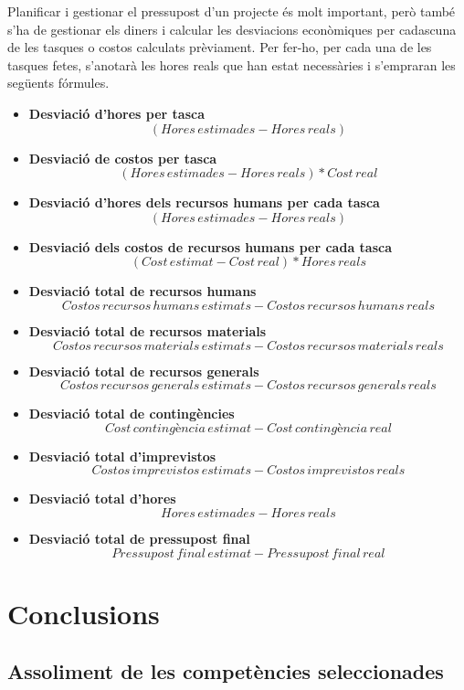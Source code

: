 \documentclass[a4paper]{article}
\begin{document}
Planificar i gestionar el pressupost d'un projecte és molt important, però també s'ha de gestionar els diners i calcular les desviacions econòmiques per cadascuna de les tasques o costos calculats prèviament. Per fer-ho, per cada una de les tasques fetes, s'anotarà les hores reals que han estat necessàries i s'empraran les següents fórmules.
\begin{itemize}
    \item \textbf{Desviació d'hores per tasca}
    \[(Hores\,estimades - Hores\,reals)\]
    \item \textbf{Desviació de costos per tasca}
    \[(Hores\,estimades - Hores\,reals) * Cost\,real\]
    \item \textbf{Desviació d'hores dels recursos humans per cada tasca}
    \[(Hores\,estimades - Hores\,reals)\]
    \item \textbf{Desviació dels costos de recursos humans per cada tasca}
    \[(Cost\, estimat - Cost\,real) * Hores\,reals\]
    \item \textbf{Desviació total de recursos humans}
    \[Costos\,recursos\,humans\,estimats - Costos\,recursos\,humans\,reals\]
    \item \textbf{Desviació total de recursos materials}
    \[Costos\,recursos\,materials\,estimats - Costos\,recursos\,materials\,reals\]
    \item \textbf{Desviació total de recursos generals}
    \[Costos\,recursos\,generals\,estimats - Costos\,recursos\,generals\,reals\]
    \item \textbf{Desviació total de contingències}
    \[Cost\,contingència\,estimat - Cost\,contingència\,real\]
    \item \textbf{Desviació total d'imprevistos}
    \[Costos\,imprevistos\,estimats - Costos\,imprevistos\,reals\]
    \item \textbf{Desviació total d'hores}
    \[Hores\,estimades - Hores\,reals\]
    \item \textbf{Desviació total de pressupost final}
    \[Pressupost\,final\,estimat - Pressupost\,final\,real\]
\end{itemize}

\newpage
\section{Conclusions}
\subsection{Assoliment de les competències seleccionades}


\newpage
\nocite{*}
\printbibliography[heading=bibintoc]
\end{document}
